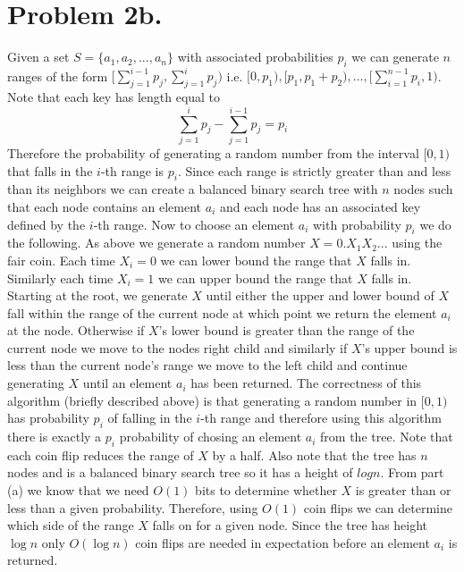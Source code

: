\documentclass[12pt]{article}
\begin{document}
\section*{Problem 2b.}
Given a set $S = \{a_1,a_2,...,a_n\}$ with associated probabilities $p_i$ we can
generate $n$ ranges of the form
$[\sum^{i-1}_{j=1} p_j, \sum^i_{j=1} p_j)$ i.e.
$[0,p_1), [p_1, p_1 + p_2),..., [\sum^{n-1}_{i=1} p_i, 1)$. Note that each key
has length equal to
$$\sum^i_{j=1} p_j - \sum^{i-1}_{j=1} p_j = p_i$$
Therefore the probability of generating a random number from the interval
$[0,1)$ that falls in the $i$-th range is $p_i$. Since each range is strictly
greater than and less than its neighbors we can create a balanced binary search tree
with $n$ nodes such that each node contains an element $a_i$ and each node has
an associated key defined by the $i$-th range. Now to choose an element $a_i$
with probability $p_i$ we do the following. As above we generate a random number
$X = 0.X_1X_2...$ using the fair coin. Each time $X_i = 0$ we can lower bound
the range that $X$ falls in. Similarly each time $X_i = 1$ we can upper bound
the range that $X$ falls in. Starting at the root, we generate $X$ until either
the upper and lower bound of $X$ fall within the range of the current node
at which point we return the element $a_i$ at the node. Otherwise if $X$'s lower
bound is greater than the range of the current node we move to the nodes right
child and similarly if $X$'s upper bound is less than the current node's range
we move to the left child and continue generating $X$ until an element $a_i$
has been returned. The correctness of this algorithm (briefly described above)
is that generating a random number in $[0,1)$ has probability $p_i$ of falling
in the $i$-th range and therefore using this algorithm there is exactly a $p_i$
probability of chosing an element $a_i$ from the tree. Note that each coin flip
reduces the range of $X$ by a half. Also note that the tree has $n$ nodes and is
a balanced binary search tree so it has a height of $log n$. From part (a) we
know that we need $O(1)$ bits to determine whether $X$ is greater than or less
than a given probability. Therefore, using $O(1)$ coin flips we can determine
which side of the range $X$ falls on for a given node. Since the tree has
height $\log n$ only $O(\log n)$ coin flips are needed in expectation before an
element $a_i$ is returned.
\end{document}

